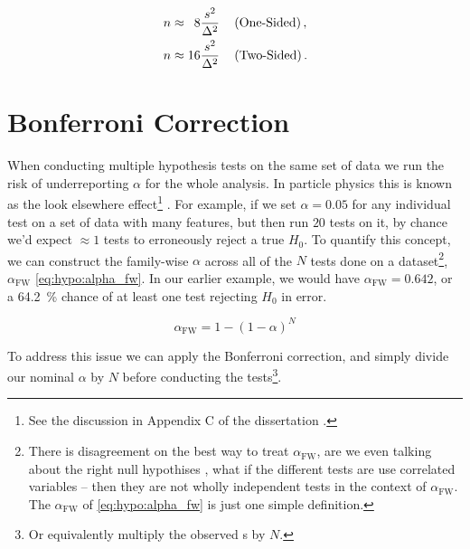 \begin{subequations}\label{eq:hypo:power:lehr}
\begin{align}
n &\approx \hphantom{1}8 \frac{s^{2}}{\Delta^{2}}\quad \left(\text{One-Sided}\right), \label{eq:hypo:power:lehr:one} \\
n &\approx 16 \frac{s^{2}}{\Delta^{2}}\quad \left(\text{Two-Sided}\right). \label{eq:hypo:power:lehr:two}
\end{align}
\end{subequations}

\section{Bonferroni Correction}
\label{hypo:bonferroni_correction}

When conducting multiple hypothesis tests on the same set of data
we run the risk of underreporting $\alpha$ for the whole analysis.
In particle physics this is known as the look elsewhere effect\footnote{See the discussion in Appendix C of the dissertation \cite{mepland_dissertation}.}
\cite{Demortier:2007zz,lyons2008,Gross2010,Ranucci:2012ed}.
For example, if we set $\alpha = \num{0.05}$ for any individual test
on a set of data with many features, but then run $\num{20}$
tests on it, by chance we'd expect $\approx \num{1}$ tests
to erroneously reject a true $H_{0}$.
To quantify this concept, we can construct
the family-wise $\alpha$ across all of the $N$ tests done on a dataset\footnote{There is
disagreement on the best way to treat $\alpha_{\text{FW}}$,
\eg are we even talking about the right null hypothises \cite{Perneger1236},
what if the different tests are use correlated variables -- then they are not wholly independent tests in the context of $\alpha_{\text{FW}}$.
The $\alpha_{\text{FW}}$ of \cref{eq:hypo:alpha_fw} is just one simple definition.},
$\alpha_{\text{FW}}$ \cref{eq:hypo:alpha_fw}.
In our earlier example, we would have $\alpha_{\text{FW}} = \num{0.642}$,
or a \SI{64.2}{\percent} chance of at least one test rejecting $H_{0}$ in error.

\begin{equation}\label{eq:hypo:alpha_fw}
\alpha_{\text{FW}} = 1 - \left(1 - \alpha\right)^{N}
\end{equation}

To address this issue we can apply the Bonferroni correction,
and simply divide our nominal $\alpha$ by $N$
before conducting the tests\footnote{Or equivalently multiply the observed {\pvalue}s by $N$.}.

